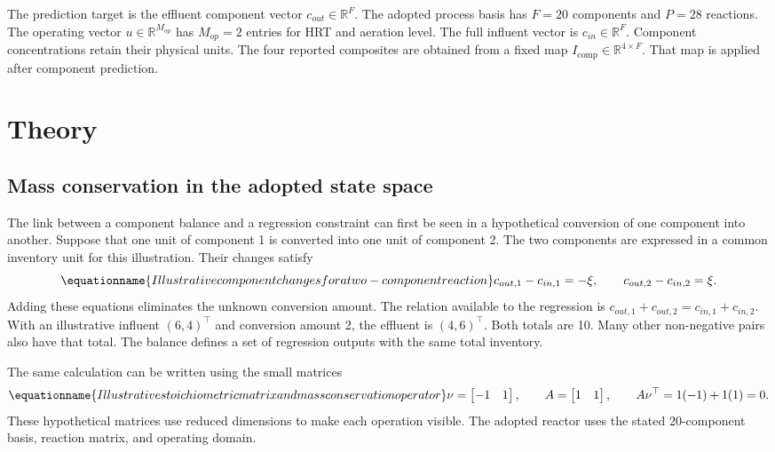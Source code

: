 The prediction target is the effluent component vector \(c_{out}\in\mathbb{R}^{F}\). The adopted process basis has \(F=20\) components and \(P=28\) reactions. The operating vector \(u\in\mathbb{R}^{M_{op}}\) has \(M_{op}=2\) entries for HRT and aeration level. The full influent vector is \(c_{in}\in\mathbb{R}^{F}\). Component concentrations retain their physical units. The four reported composites are obtained from a fixed map \(I_{\mathrm{comp}}\in\mathbb{R}^{4\times F}\). That map is applied after component prediction.

\section{Theory}

\subsection{Mass conservation in the adopted state space}

The link between a component balance and a regression constraint can first be seen in a hypothetical conversion of one component into another. Suppose that one unit of component 1 is converted into one unit of component 2. The two components are expressed in a common inventory unit for this illustration. Their changes satisfy
\begin{equation}
\equationname{Illustrative component changes for a two-component reaction}
\label{eq:icsor_scalar_inventory_example}
c_{out,1}-c_{in,1}=-\xi,
\qquad
c_{out,2}-c_{in,2}=\xi.
\end{equation}
Adding these equations eliminates the unknown conversion amount. The relation available to the regression is \(c_{out,1}+c_{out,2}=c_{in,1}+c_{in,2}\). With an illustrative influent \((6,4)^\top\) and conversion amount 2, the effluent is \((4,6)^\top\). Both totals are 10. Many other non-negative pairs also have that total. The balance defines a set of regression outputs with the same total inventory.

The same calculation can be written using the small matrices
\begin{equation}
\equationname{Illustrative stoichiometric matrix and mass conservation operator}
\label{eq:icsor_small_inventory_matrices}
\nu=\begin{bmatrix}-1&1\end{bmatrix},
\qquad
A=\begin{bmatrix}1&1\end{bmatrix},
\qquad
A\nu^\top=1(-1)+1(1)=0.
\end{equation}
These hypothetical matrices use reduced dimensions to make each operation visible. The adopted reactor uses the stated 20-component basis, reaction matrix, and operating domain.

